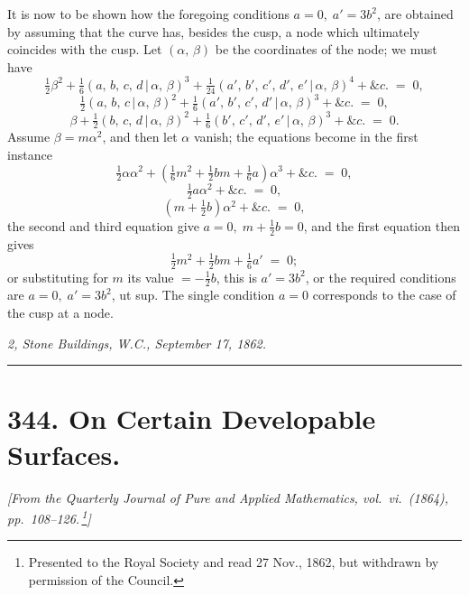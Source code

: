 \documentclass[11pt,a4paper]{article}
\providecommand{\mid}{\,|\,}
\begin{document}
\medskip

It is now to be shown how the foregoing conditions $a = 0,\;a' = 3b^2$, are obtained by assuming that the curve has, besides the cusp, a node which ultimately coincides with the cusp. Let $(\alpha,\,\beta)$ be the coordinates of the node; we must have
\[
\tfrac{1}{2}\beta^2 + \tfrac{1}{6}(a,\,b,\,c,\,d\mid \alpha,\,\beta)^3 + \tfrac{1}{24}(a',\,b',\,c',\,d',\,e'\mid \alpha,\,\beta)^4 + \&c. \;=\; 0,
\]
\[
\tfrac{1}{2}(a,\,b,\,c\mid \alpha,\,\beta)^2 + \tfrac{1}{6}(a',\,b',\,c',\,d'\mid \alpha,\,\beta)^3 + \&c. \;=\; 0,
\]
\[
\beta + \tfrac{1}{2}(b,\,c,\,d\mid \alpha,\,\beta)^2 + \tfrac{1}{6}(b',\,c',\,d',\,e'\mid \alpha,\,\beta)^3 + \&c. \;=\; 0.
\]
Assume $\beta = m\alpha^2$, and then let $\alpha$ vanish; the equations become in the first instance
\[
\tfrac{1}{2}\alpha\alpha^2 + (\tfrac{1}{6}m^2 + \tfrac{1}{2}bm + \tfrac{1}{6}a)\alpha^3 + \&c. \;=\; 0,
\]
\[
\tfrac{1}{2}a\alpha^2 + \&c. \;=\; 0,
\]
\[
(m + \tfrac{1}{2}b)\alpha^2 + \&c. \;=\; 0,
\]
the second and third equation give $a = 0,\;m + \tfrac{1}{2}b = 0$, and the first equation then gives
\[
\tfrac{1}{2}m^2 + \tfrac{1}{2}bm + \tfrac{1}{6}a' \;=\; 0;
\]
or substituting for $m$ its value $= -\tfrac{1}{2}b$, this is $a' = 3b^2$, or the required conditions are $a = 0,\;a' = 3b^2$, ut sup. The single condition $a = 0$ corresponds to the case of the cusp at a node.

\medskip\medskip

\hfill\textit{2, Stone Buildings, W.C., September 17, 1862.}


\bigskip
\noindent\rule{\textwidth}{0.4pt}
\bigskip

\section*{344. On Certain Developable Surfaces.}

\noindent\textit{[From the Quarterly Journal of Pure and Applied Mathematics, vol.~vi.\ (1864), pp.~108--126.\,\footnote{Presented to the Royal Society and read 27 Nov., 1862, but withdrawn by permission of the Council.}]}

\medskip
\end{document}
